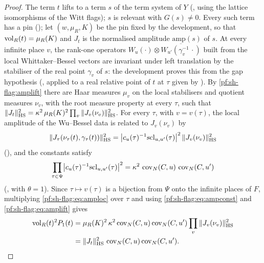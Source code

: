 \begin{proof}
The term $t$ lifts to a term $s$ of the term system of $Y$ (, using the lattice
isomorphisms of the Witt flags); $s$ is relevant with $G(s)\ne0$. Every such term has a pin
(); let $(w,\mu_R,K)$ be the pin fixed by the development, so that
$\operatorname{vol}_R(t)=\mu_R(K)$ and $J_t$ is the normalised amplitude $\mathrm{amp}(s)$ of $s$. At every infinite place $v$, the
rank-one operators $W_u(\cdot)\otimes\overline{W_{u'}(\gamma_v^{-1}\,\cdot)}$ built from the local Whittaker--Bessel vectors
are invariant under left translation by the stabiliser of the real point $\gamma_v$ of $s$: the development proves this
from the gap hypothesis (, applied to a real relative point of $t$ at $\tau$ given by
). By \cref{pf:sh-flag:amplift} there are Haar measures $\mu_v$
on the local stabilisers and quotient measures $\nu_v$, with the root measure property at every $\tau$, such that
$\|J_t\|_{\mathrm{HS}}^2=\kappa^2\,\mu_R(K)^2\prod_v\|J_v(\nu_v)\|_{\mathrm{HS}}^2$. For every $\tau$, with $v=v(\tau)$, the local amplitude of the Wu--Bessel data is related to $J_v(\nu_v)$ by
\begin{equation}\label{pf:sh-flag:eq:amploc}
\|J_\tau(\nu_\tau(t),\gamma_\tau(t))\|_{\mathrm{HS}}^2=\bigl|c_u(\tau)^{-1}\mathrm{scl}_{u,u'}(\tau)\bigr|^2\,\|J_v(\nu_v)\|_{\mathrm{HS}}^2
\end{equation}
(), and the constants satisfy
\begin{equation}\label{pf:sh-flag:eq:ampconst}
\prod_{\tau\in\Psi}\bigl|c_u(\tau)^{-1}\mathrm{scl}_{u,u'}(\tau)\bigr|^2=\kappa^2\,\operatorname{cov}_N(C,u)\,\operatorname{cov}_N(C,u')
\end{equation}
(, with $\theta=1$). Since $\tau\mapsto v(\tau)$ is a bijection from
$\Psi$ onto the infinite places of $F$, multiplying \eqref{pf:sh-flag:eq:amploc} over $\tau$ and using
\eqref{pf:sh-flag:eq:ampconst} and \eqref{pf:sh-flag:eq:amplift} gives
\begin{align*}
\operatorname{vol}_R(t)^2P_1(t)&=\mu_R(K)^2\,\kappa^2\operatorname{cov}_N(C,u)\operatorname{cov}_N(C,u')\prod_v\|J_v(\nu_v)\|_{\mathrm{HS}}^2\\
&=\|J_t\|_{\mathrm{HS}}^2\,\operatorname{cov}_N(C,u)\operatorname{cov}_N(C,u').\qedhere
\end{align*}
\end{proof}

